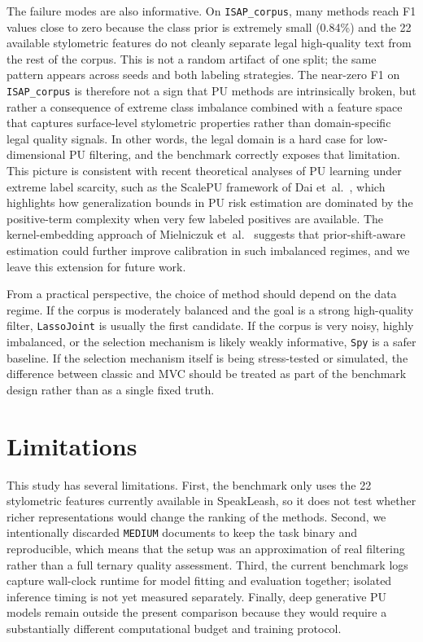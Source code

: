 \documentclass[applsci,article,accept,pdftex,moreauthors]{Definitions/mdpi}
\newcommand{\rev}[1]{{#1}}
\begin{document}
\rev{The failure modes are also informative. On \texttt{ISAP\_corpus}, many methods reach F1 values close to zero because the class prior is extremely small (0.84\%) and the 22 available stylometric features do not cleanly separate legal high-quality text from the rest of the corpus. This is not a random artifact of one split; the same pattern appears across seeds and both labeling strategies. The near-zero F1 on \texttt{ISAP\_corpus} is therefore not a sign that PU methods are intrinsically broken, but rather a consequence of extreme class imbalance combined with a feature space that captures surface-level stylometric properties rather than domain-specific legal quality signals. In other words, the legal domain is a hard case for low-dimensional PU filtering, and the benchmark correctly exposes that limitation. This picture is consistent with recent theoretical analyses of PU learning under extreme label scarcity, such as the ScalePU framework of Dai et~al.~\cite{dai2026scalepu}, which highlights how generalization bounds in PU risk estimation are dominated by the positive-term complexity when very few labeled positives are available. The kernel-embedding approach of Mielniczuk et~al.~\cite{mielniczuk2026priorshift} suggests that prior-shift-aware estimation could further improve calibration in such imbalanced regimes, and we leave this extension for future work.}

\rev{From a practical perspective, the choice of method  should depend on the data regime. If the corpus is moderately balanced and the goal is a strong high-quality filter, \texttt{LassoJoint} is usually the first candidate. If the corpus is very noisy, highly imbalanced, or the selection mechanism is likely weakly informative, \texttt{Spy} is a safer baseline. If the selection mechanism itself is being stress-tested or simulated, the difference between classic and MVC should be treated as part of the benchmark design rather than as a single fixed truth.}

\section{Limitations}
\label{sec:limitations}

\rev{This study has several limitations. First, the benchmark only uses  the 22 stylometric features currently available in SpeakLeash, so it does not test whether richer representations would change the ranking of the methods. Second, we intentionally discarded \texttt{MEDIUM} documents to keep the task binary and reproducible, which means that the setup was an approximation of real filtering rather than a full ternary quality assessment. Third, the current benchmark logs capture wall-clock runtime for model fitting and evaluation together; isolated inference timing is not yet measured separately. Finally, deep generative PU models remain outside the present comparison because they would require a substantially different computational budget and training protocol.}
\end{document}
